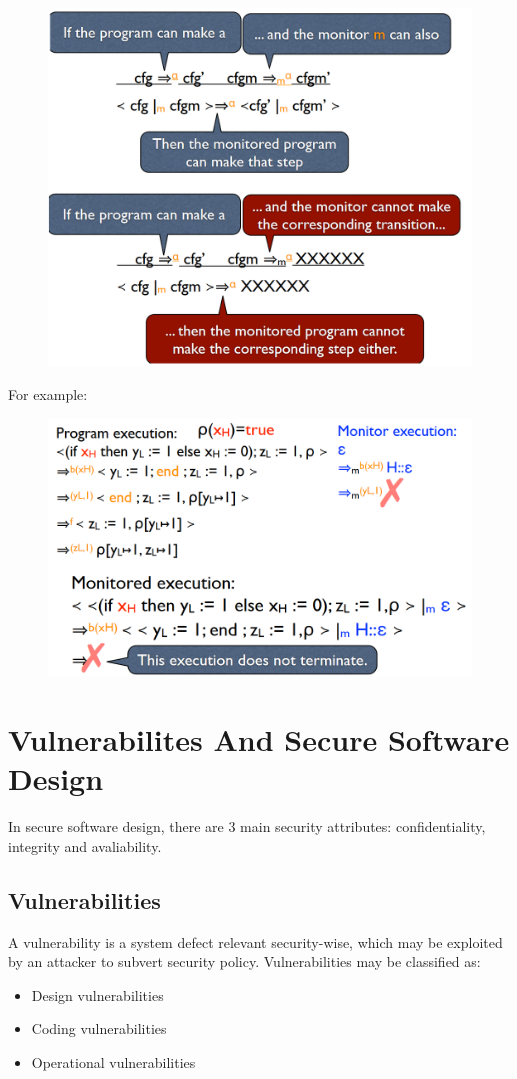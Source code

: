 \documentclass[10pt,a4paper]{report}
\begin{document}
\begin{figure}[H]
\centering
\includegraphics[scale=0.4]{35.png}
\end{figure}
For example:
\begin{figure}[H]
\centering
\includegraphics[scale=0.4]{36.png}
\end{figure}


\chapter{Vulnerabilites And Secure Software Design}
In secure software design, there are 3 main security attributes: confidentiality, integrity and avaliability.
\section{Vulnerabilities}
A vulnerability is a system defect relevant security-wise, which may be exploited by an attacker to subvert security policy. Vulnerabilities may be classified as:
\begin{itemize}
\item Design vulnerabilities
\item Coding vulnerabilities
\item Operational vulnerabilities
\end{itemize}
\end{document}
